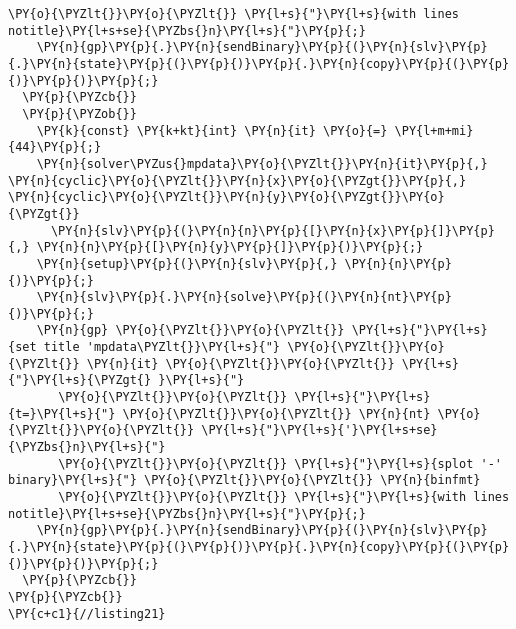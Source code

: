 \begin{Verbatim}[commandchars=\\\{\}]
       \PY{o}{\PYZlt{}}\PY{o}{\PYZlt{}} \PY{l+s}{"}\PY{l+s}{with lines notitle}\PY{l+s+se}{\PYZbs{}n}\PY{l+s}{"}\PY{p}{;}
    \PY{n}{gp}\PY{p}{.}\PY{n}{sendBinary}\PY{p}{(}\PY{n}{slv}\PY{p}{.}\PY{n}{state}\PY{p}{(}\PY{p}{)}\PY{p}{.}\PY{n}{copy}\PY{p}{(}\PY{p}{)}\PY{p}{)}\PY{p}{;}
  \PY{p}{\PYZcb{}} 
  \PY{p}{\PYZob{}}
    \PY{k}{const} \PY{k+kt}{int} \PY{n}{it} \PY{o}{=} \PY{l+m+mi}{44}\PY{p}{;}
    \PY{n}{solver\PYZus{}mpdata}\PY{o}{\PYZlt{}}\PY{n}{it}\PY{p}{,} \PY{n}{cyclic}\PY{o}{\PYZlt{}}\PY{n}{x}\PY{o}{\PYZgt{}}\PY{p}{,} \PY{n}{cyclic}\PY{o}{\PYZlt{}}\PY{n}{y}\PY{o}{\PYZgt{}}\PY{o}{\PYZgt{}} 
      \PY{n}{slv}\PY{p}{(}\PY{n}{n}\PY{p}{[}\PY{n}{x}\PY{p}{]}\PY{p}{,} \PY{n}{n}\PY{p}{[}\PY{n}{y}\PY{p}{]}\PY{p}{)}\PY{p}{;} 
    \PY{n}{setup}\PY{p}{(}\PY{n}{slv}\PY{p}{,} \PY{n}{n}\PY{p}{)}\PY{p}{;} 
    \PY{n}{slv}\PY{p}{.}\PY{n}{solve}\PY{p}{(}\PY{n}{nt}\PY{p}{)}\PY{p}{;} 
    \PY{n}{gp} \PY{o}{\PYZlt{}}\PY{o}{\PYZlt{}} \PY{l+s}{"}\PY{l+s}{set title 'mpdata\PYZlt{}}\PY{l+s}{"} \PY{o}{\PYZlt{}}\PY{o}{\PYZlt{}} \PY{n}{it} \PY{o}{\PYZlt{}}\PY{o}{\PYZlt{}} \PY{l+s}{"}\PY{l+s}{\PYZgt{} }\PY{l+s}{"}
       \PY{o}{\PYZlt{}}\PY{o}{\PYZlt{}} \PY{l+s}{"}\PY{l+s}{t=}\PY{l+s}{"} \PY{o}{\PYZlt{}}\PY{o}{\PYZlt{}} \PY{n}{nt} \PY{o}{\PYZlt{}}\PY{o}{\PYZlt{}} \PY{l+s}{"}\PY{l+s}{'}\PY{l+s+se}{\PYZbs{}n}\PY{l+s}{"}
       \PY{o}{\PYZlt{}}\PY{o}{\PYZlt{}} \PY{l+s}{"}\PY{l+s}{splot '-' binary}\PY{l+s}{"} \PY{o}{\PYZlt{}}\PY{o}{\PYZlt{}} \PY{n}{binfmt}
       \PY{o}{\PYZlt{}}\PY{o}{\PYZlt{}} \PY{l+s}{"}\PY{l+s}{with lines notitle}\PY{l+s+se}{\PYZbs{}n}\PY{l+s}{"}\PY{p}{;}
    \PY{n}{gp}\PY{p}{.}\PY{n}{sendBinary}\PY{p}{(}\PY{n}{slv}\PY{p}{.}\PY{n}{state}\PY{p}{(}\PY{p}{)}\PY{p}{.}\PY{n}{copy}\PY{p}{(}\PY{p}{)}\PY{p}{)}\PY{p}{;}
  \PY{p}{\PYZcb{}}
\PY{p}{\PYZcb{}}
\PY{c+c1}{//listing21}
\end{Verbatim}
